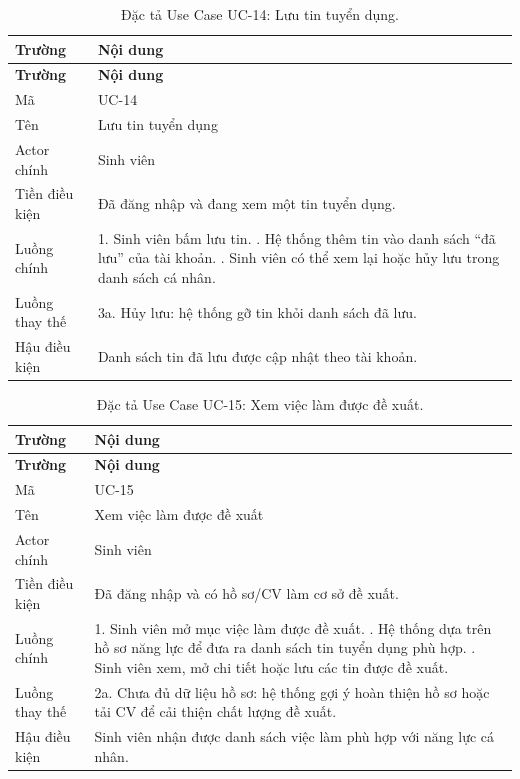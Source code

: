 \begin{longtable}{|L{3.5cm}|L{10cm}|}
\caption{Đặc tả Use Case UC-14: Lưu tin tuyển dụng.}
\label{tab:uc14} \\
\hline
\textbf{Trường} & \textbf{Nội dung} \\
\hline
\endfirsthead
\hline
\textbf{Trường} & \textbf{Nội dung} \\
\hline
\endhead
Mã & UC-14 \\
\hline
Tên & Lưu tin tuyển dụng \\
\hline
Actor chính & Sinh viên \\
\hline
Tiền điều kiện & Đã đăng nhập và đang xem một tin tuyển dụng. \\
\hline
Luồng chính & 1. Sinh viên bấm lưu tin. . Hệ thống thêm tin vào danh sách ``đã lưu'' của tài khoản. . Sinh viên có thể xem lại hoặc hủy lưu trong danh sách cá nhân. \\
\hline
Luồng thay thế & 3a. Hủy lưu: hệ thống gỡ tin khỏi danh sách đã lưu. \\
\hline
Hậu điều kiện & Danh sách tin đã lưu được cập nhật theo tài khoản. \\
\hline
\end{longtable}

\begin{longtable}{|L{3.5cm}|L{10cm}|}
\caption{Đặc tả Use Case UC-15: Xem việc làm được đề xuất.}
\label{tab:uc15} \\
\hline
\textbf{Trường} & \textbf{Nội dung} \\
\hline
\endfirsthead
\hline
\textbf{Trường} & \textbf{Nội dung} \\
\hline
\endhead
Mã & UC-15 \\
\hline
Tên & Xem việc làm được đề xuất \\
\hline
Actor chính & Sinh viên \\
\hline
Tiền điều kiện & Đã đăng nhập và có hồ sơ/CV làm cơ sở đề xuất. \\
\hline
Luồng chính & 1. Sinh viên mở mục việc làm được đề xuất. . Hệ thống dựa trên hồ sơ năng lực để đưa ra danh sách tin tuyển dụng phù hợp. . Sinh viên xem, mở chi tiết hoặc lưu các tin được đề xuất. \\
\hline
Luồng thay thế & 2a. Chưa đủ dữ liệu hồ sơ: hệ thống gợi ý hoàn thiện hồ sơ hoặc tải CV để cải thiện chất lượng đề xuất. \\
\hline
Hậu điều kiện & Sinh viên nhận được danh sách việc làm phù hợp với năng lực cá nhân. \\
\hline
\end{longtable}

